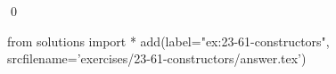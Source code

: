 
\begin{ex}
  \label{ex:23-61-constructors}
  
  \qed
\end{ex}
\begin{python0}
from solutions import *
add(label="ex:23-61-constructors",
    srcfilename='exercises/23-61-constructors/answer.tex')
\end{python0}
